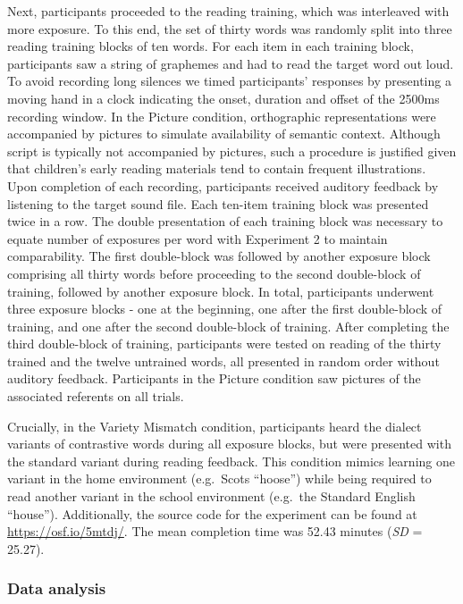 \documentclass[doc,floatsintext]{apa6}
\begin{document}
Next, participants proceeded to the reading training, which was
interleaved with more exposure. To this end, the set of thirty words was
randomly split into three reading training blocks of ten words. For each
item in each training block, participants saw a string of graphemes and
had to read the target word out loud. To avoid recording long silences
we timed participants' responses by presenting a moving hand in a clock
indicating the onset, duration and offset of the 2500ms recording
window. In the Picture condition, orthographic representations were
accompanied by pictures to simulate availability of semantic context.
Although script is typically not accompanied by pictures, such a
procedure is justified given that children's early reading materials
tend to contain frequent illustrations. Upon completion of each
recording, participants received auditory feedback by listening to the
target sound file. Each ten-item training block was presented twice in a
row. The double presentation of each training block was necessary to
equate number of exposures per word with Experiment 2 to maintain
comparability. The first double-block was followed by another exposure
block comprising all thirty words before proceeding to the second
double-block of training, followed by another exposure block. In total,
participants underwent three exposure blocks - one at the beginning, one
after the first double-block of training, and one after the second
double-block of training. After completing the third double-block of
training, participants were tested on reading of the thirty trained and
the twelve untrained words, all presented in random order without
auditory feedback. Participants in the Picture condition saw pictures of
the associated referents on all trials.

Crucially, in the Variety Mismatch condition, participants heard the
dialect variants of contrastive words during all exposure blocks, but
were presented with the standard variant during reading feedback. This
condition mimics learning one variant in the home environment
(e.g.~Scots \enquote{hoose}) while being required to read another
variant in the school environment (e.g.~the Standard English
\enquote{house}). Additionally, the source code for the experiment can
be found at \url{https://osf.io/5mtdj/}. The mean completion time was
52.43 minutes (\emph{SD} = 25.27).

\subsubsection{Data analysis}\label{data-analysis}
\end{document}
